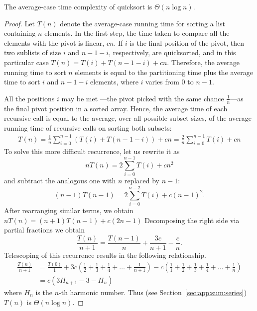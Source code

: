 \begin{Lemma}\label{lem:qsort:ave:comp}
The average-case time complexity of quicksort is \(\Theta(n\log n)\).
\end{Lemma}
\begin{proof}
Let $T(n)$ denote the average-case running time for sorting a list containing 
$n$ elements. In the first step, the time taken to compare all the elements with 
the pivot is linear, $cn$. If $i$ is the final position of the pivot,
then two sublists of size $i$ and $n-1-i$, respectively,
are quicksorted, and in this particular case \(T(n)=T(i)+T(n-1-i)+cn\). 
Therefore, the average running time to sort $n$ elements is equal to the
partitioning time plus the average time to sort $i$ and $n-1-i$ elements, where
$i$ varies from $0$ to $n-1$.

All the positions $i$ may be met ---the pivot picked 
with the same chance \(\frac{1}{n}\)---as the final pivot position in a sorted
array.  Hence, the average time of each recursive call is equal to the 
average, over all possible subset sizes, of the average running time of 
recursive calls on sorting both subsets:
\begin{eqnarray*}
T(n) = \frac{1}{n} \sum\limits_{i=0}^{n-1} \left(T(i)+T(n-1-i)\right) +cn
= \frac{2}{n}\sum\limits_{i=0}^{n-1}T(i)+cn
\end{eqnarray*}
To solve this more difficult recurrence, let us rewrite it as
$$
nT(n)  = 2 \sum_{i=0}^{n-1}T(i) + cn^{2}
$$ 
and subtract the analogous one with $n$ replaced by $n-1$:
$$
(n-1)T(n-1)  = 2\sum_{i=0}^{n-2}T(i) + c(n-1)^{2}.
$$ 
After rearranging similar terms, we obtain
\(
nT(n)=(n+1)T(n-1)+c(2n-1) %
\)
Decomposing the right side via partial fractions we obtain
$$
\frac{T(n)}{n+1} =
\frac{T(n-1)}{n} + \frac{3c}{n+1} - \frac{c}{n}. %
$$
Telescoping of this recurrence results in the following relationship.
\begin{align*}
\frac{T(n)}{n+1} & = \frac{T(0)}{1}  +
3c\left (
\frac{1}{2}+\frac{1}{3}+\frac{1}{4}+\ldots+\frac{1}{n+1} 
\right ) - c\left (
\frac{1}{1} + \frac{1}{2}+\frac{1}{3}+\frac{1}{4}+\ldots+\frac{1}{n}
\right ) \\
& =  c (3H_{n+1}-3-H_{n})
 \end{align*}
where \(H_{n}\) is the $n$-th harmonic number.
Thus (see Section~\ref{sec:app:sum:series}) $T(n)$ is $\Theta(n \log n)$.
\end{proof}

